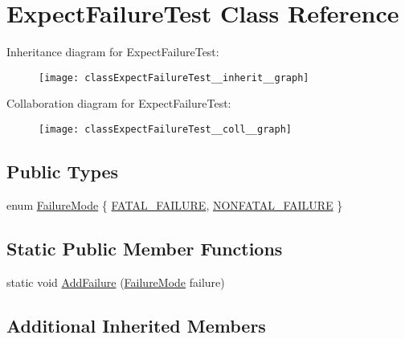 \hypertarget{classExpectFailureTest}{}\section{Expect\+Failure\+Test Class Reference}
\label{classExpectFailureTest}


Inheritance diagram for Expect\+Failure\+Test\+:
\nopagebreak
\begin{figure}[H]
\begin{center}
\leavevmode
\texttt{[image: classExpectFailureTest\_\_inherit\_\_graph]}
\end{center}
\end{figure}


Collaboration diagram for Expect\+Failure\+Test\+:
\nopagebreak
\begin{figure}[H]
\begin{center}
\leavevmode
\texttt{[image: classExpectFailureTest\_\_coll\_\_graph]}
\end{center}
\end{figure}
\subsection*{Public Types}
\begin{DoxyCompactItemize}
\item 
enum \hyperlink{classExpectFailureTest_aad05da10bb15d21a434eba3b37011406}{Failure\+Mode} \{ \hyperlink{classExpectFailureTest_aad05da10bb15d21a434eba3b37011406a3d618496b7e2a2c256e02186bddee4ec}{F\+A\+T\+A\+L\+\_\+\+F\+A\+I\+L\+U\+RE}, 
\hyperlink{classExpectFailureTest_aad05da10bb15d21a434eba3b37011406aeabdbecc0c4550d4f46cd44ac62fb92b}{N\+O\+N\+F\+A\+T\+A\+L\+\_\+\+F\+A\+I\+L\+U\+RE}
 \}
\end{DoxyCompactItemize}
\subsection*{Static Public Member Functions}
\begin{DoxyCompactItemize}
\item 
static void \hyperlink{classExpectFailureTest_ab9aeb7820ff7953fc2975ecc5abd046b}{Add\+Failure} (\hyperlink{classExpectFailureTest_aad05da10bb15d21a434eba3b37011406}{Failure\+Mode} failure)
\end{DoxyCompactItemize}
\subsection*{Additional Inherited Members}


